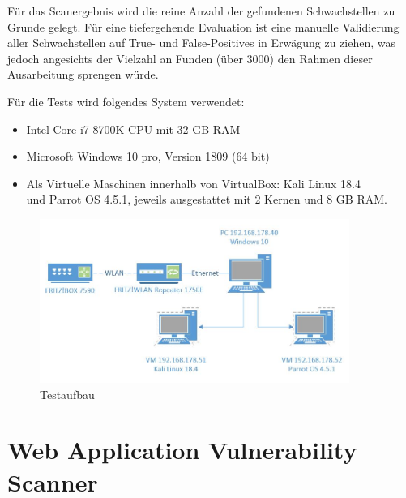 \documentclass[12pt,oneside,a4paper,parskip,pointlessnumbers]{scrbook}
\begin{document}
   Für das Scanergebnis wird die reine Anzahl der gefundenen Schwachstellen zu Grunde gelegt. Für eine tiefergehende Evaluation ist eine manuelle Validierung aller Schwachstellen auf True- und False-Positives in Erwägung zu ziehen, was jedoch angesichts der Vielzahl an Funden (über 3000) den Rahmen dieser Ausarbeitung sprengen würde.

  Für die Tests wird folgendes System verwendet:
  \begin{itemize}
    \item Intel Core i7-8700K CPU mit 32 GB RAM
    \item Microsoft Windows 10 pro, Version 1809 (64 bit)
    \item Als Virtuelle Maschinen innerhalb von VirtualBox: Kali Linux 18.4 \\
    und Parrot OS 4.5.1, jeweils ausgestattet mit 2 Kernen und 8 GB RAM.
  \end{itemize}
  \vspace{20pt}
  \begin{figure}[H]
    \centering
    \includegraphics[width=0.9\textwidth]{Images/Visio}
    \caption[Testaufbau]{Testaufbau}
  \end{figure}
  \vspace{20pt}
\section{Web Application Vulnerability Scanner}
\end{document}
